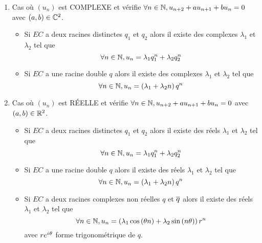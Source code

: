 \begin{defprop}
    \begin{enumerate}
        \item Cas où \((u_n)\) est COMPLEXE et vérifie \(\forall n \in \mathbb{N}, u_{n+2} + a u_{n+1} + b u_n = 0\) avec \(\left(a,b\right) \in \mathbb{C}^2\).
        \begin{itemize}
            \item Si \(EC\) a deux racines distinctes \(q_1\) et \(q_2\) alors il existe des complexes \(\lambda_1\) et \(\lambda_2\) tel que 
            \[\forall n \in \mathbb{N},u_n = \lambda_1 q_1^n + \lambda_2q_2^n\]
            \item Si \(EC\) a une racine double \(q\) alors il existe des complexes \(\lambda_1\) et \(\lambda_2\) tel que 
            \[\forall n \in \mathbb{N},u_n = \left(\lambda_1 + \lambda_2 n\right)q^n\]
        \end{itemize}
        \item Cas où \((u_n)\) est RÉELLE  et vérifie \(\forall n \in \mathbb{N}, u_{n+2} + a u_{n+1} + b u_n = 0\) avec \(\left(a,b\right) \in \mathbb{R}^2\).
        \begin{itemize}
            \item Si \(EC\) a deux racines distinctes \(q_1\) et \(q_2\) alors il existe des réels \(\lambda_1\) et \(\lambda_2\) tel que 
            \[\forall n \in \mathbb{N},u_n = \lambda_1 q_1^n + \lambda_2q_2^n\]
            \item Si \(EC\) a une racine double \(q\) alors il existe des réels \(\lambda_1\) et \(\lambda_2\) tel que 
            \[\forall n \in \mathbb{N},u_n = \left(\lambda_1 + \lambda_2 n\right)q^n\]
            \item Si \(EC\) a deux racines complexes non réelles \(q\) et \(\overline{q}\) alors il existe des réels \(\lambda_1\) et \(\lambda_2\) tel que 
            \[\forall n \in \mathbb{N},u_n = \left(\lambda_1\cos\left(\theta n\right) + \lambda_2 \sin \left(n \theta\right)\right)r^n\]
            avec \(re^{i\mkern1mu \theta}\) forme trigonométrique de \(q\).
        \end{itemize}
    \end{enumerate}
\end{defprop}

